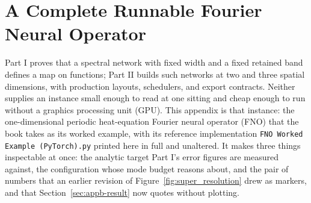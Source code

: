 

\chapter{A Complete Runnable Fourier Neural Operator}\label{app:b}

Part I proves that a spectral network with fixed width and a fixed retained band
defines a map on functions; Part II builds such networks at two and three spatial
dimensions, with production layouts, schedulers, and export contracts. Neither
supplies an instance small enough to read at one sitting and cheap enough to run
without a graphics processing unit (GPU). This appendix is that instance: the
one-dimensional periodic heat-equation Fourier neural operator (FNO)
\cite{li2021fourier} that the book takes as its worked example, with its
reference implementation \texttt{FNO Worked Example (PyTorch).py} printed here in
full and unaltered. It makes three things inspectable at once: the analytic target
Part I's error figures are measured against, the configuration whose mode budget
reasons about, and the pair of numbers that an earlier revision of
Figure~\ref{fig:super_resolution} drew as markers, and that
Section~\ref{sec:appb-result} now quotes without plotting.

